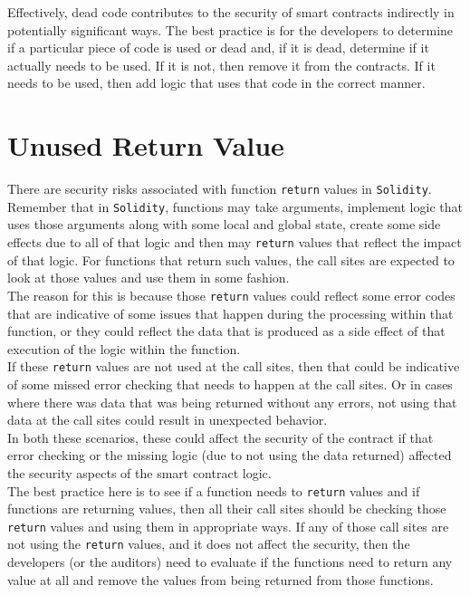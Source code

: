 Effectively, dead code contributes to the security of smart contracts indirectly in potentially significant ways. The best practice is for the developers to determine if a particular piece of code is used or dead and, if it is dead, determine if it actually needs to be used. If it is not, then remove it from the contracts. If it needs to be used, then add logic that uses that code in the correct manner.

\section{Unused Return Value}
There are security risks associated with function \texttt{return} values in \texttt{Solidity}. Remember that in \texttt{Solidity}, functions may take arguments, implement logic that uses those arguments along with some local and global state, create some side effects due to all of that logic and then may \texttt{return} values that reflect the impact of that logic. For functions that return such values, the call sites are expected to look at those values and use them in some fashion. \\

The reason for this is because those \texttt{return} values could reflect some error codes that are indicative of some issues that happen during the processing within that function, or they could reflect the data that is produced as a side effect of that execution of the logic within the function. \\

If these \texttt{return} values are not used at the call sites, then that could be indicative of some missed error checking that needs to happen at the call sites. Or in cases where there was data that was being returned without any errors, not using that data at the call sites could result in unexpected behavior.\\

In both these scenarios, these could affect the security of the contract if that error checking or the missing logic (due to not using the data returned) affected the security aspects of the smart contract logic. \\

The best practice here is to see if a function needs to \texttt{return} values and if functions are returning values, then all their call sites should be checking those \texttt{return} values and using them in appropriate ways. If any of those call sites are not using the \texttt{return} values, and it does not affect the security, then the developers (or the auditors) need to evaluate if the functions need to return any value at all and remove the values from being returned from those functions.

